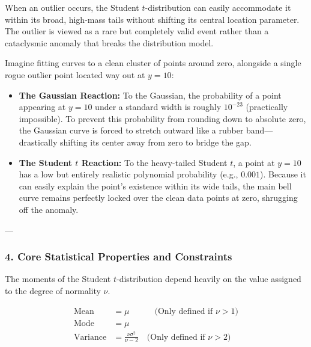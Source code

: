 \documentclass{article}
\begin{document}
When an outlier occurs, the Student $t$-distribution can easily accommodate it within its broad, high-mass tails without shifting its central location parameter. The outlier is viewed as a rare but completely valid event rather than a cataclysmic anomaly that breaks the distribution model.

\begin{tcolorbox}[colback=blue!5!white, colframe=blue!60!black, title=Intuitive Breakdown: The Outlier Vulnerability]
Imagine fitting curves to a clean cluster of points around zero, alongside a single rogue outlier point located way out at $y = 10$:
\begin{itemize}
    \item \textbf{The Gaussian Reaction:} To the Gaussian, the probability of a point appearing at $y=10$ under a standard width is roughly $10^{-23}$ (practically impossible). To prevent this probability from rounding down to absolute zero, the Gaussian curve is forced to stretch outward like a rubber band—drastically shifting its center away from zero to bridge the gap.
    \item \textbf{The Student $t$ Reaction:} To the heavy-tailed Student $t$, a point at $y=10$ has a low but entirely realistic polynomial probability (e.g., $0.001$). Because it can easily explain the point's existence within its wide tails, the main bell curve remains perfectly locked over the clean data points at zero, shrugging off the anomaly.
\end{itemize}
\end{tcolorbox}

---

\subsubsection*{4. Core Statistical Properties and Constraints}
The moments of the Student $t$-distribution depend heavily on the value assigned to the degree of normality $\nu$.

\begin{align}
    \text{Mean} &= \mu \quad \quad \quad \text{(Only defined if } \nu > 1) \tag{2.131} \\
    \text{Mode} &= \mu \\
    \text{Variance} &= \frac{\nu \sigma^2}{\nu - 2} \quad \text{(Only defined if } \nu > 2) \tag{2.131}
\end{align}
\end{document}

